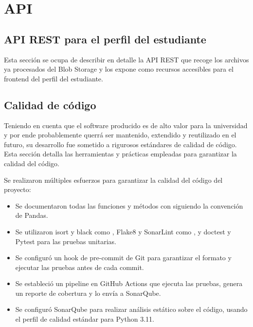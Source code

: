 \chapter{API}

\section{API REST para el perfil del estudiante}


Esta sección se ocupa de describir en detalle la \gls{API REST} que recoge los archivos ya procesados del Blob Storage y los expone como recursos accesibles para el frontend del perfil del estudiante.


\section{Calidad de código}


Teniendo en cuenta que el software producido es de alto valor para la universidad y por ende probablemente querrá ser mantenido, extendido y reutilizado en el futuro, su desarrollo fue sometido a rigurosos estándares de calidad de código. Esta sección detalla las herramientas y prácticas empleadas para garantizar la calidad del código.

\begin{resumen}
	Se realizaron múltiples esfuerzos para garantizar la calidad del código del proyecto:
	\begin{itemize}
		\item Se documentaron todas las funciones y métodos con  siguiendo la convención de \gls{Pandas}.
		\item Se utilizaron \gls{isort} y \gls{black} como , \gls{Flake8} y \gls{SonarLint} como , y \gls{doctest} y \gls{Pytest} para las \gls{pruebas unitarias}.
		\item Se configuró un \gls{hook} de pre-commit de \gls{Git} para garantizar el formato y ejecutar las pruebas antes de cada commit.
		\item Se estableció un \gls{pipeline} en \gls{GitHub Actions} que ejecuta las pruebas, genera un reporte de cobertura y lo envía a \gls{SonarQube}.
		\item Se configuró \gls{SonarQube} para realizar análisis estático sobre el código, usando el \gls{perfil de calidad} estándar para \gls{Python} 3.11.
	\end{itemize}
\end{resumen}


